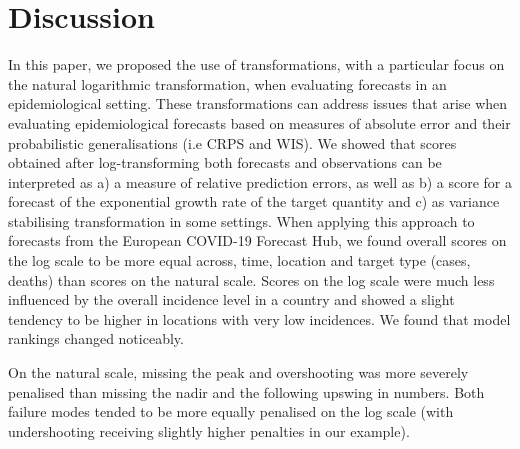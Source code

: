 \documentclass[10pt,letterpaper]{article}
\begin{document}
\section*{Discussion}
\label{sec:discussion}

In this paper, we proposed the use of transformations, with a particular focus on the natural logarithmic transformation, when evaluating forecasts in an epidemiological setting. These transformations can address issues that arise when evaluating epidemiological forecasts based on measures of absolute error and their probabilistic generalisations (i.e CRPS and WIS). We showed that scores obtained after log-transforming both forecasts and observations can be interpreted as a) a measure of relative prediction errors, as well as b) a score for a forecast of the exponential growth rate of the target quantity and c) as variance stabilising transformation in some settings.
When applying this approach to forecasts from the European COVID-19 Forecast Hub, we found overall scores on the log scale to be more equal across, time, location and target type (cases, deaths) than scores on the natural scale. Scores on the log scale were much less influenced by the overall incidence level in a country and showed a slight tendency to be higher in locations with very low incidences. We found that model rankings changed noticeably. 

On the natural scale, missing the peak and overshooting was more severely penalised than missing the nadir and the following upswing in numbers. Both failure modes tended to be more equally penalised on the log scale (with undershooting receiving slightly higher penalties in our example). 
\end{document}
